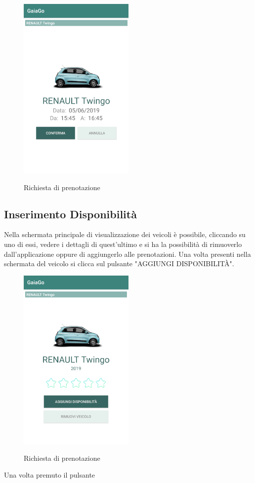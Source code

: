 \begin{itemize}
\begin{figure}[H]
		\includegraphics[width=0.5\textwidth]{res/images/conferma_prenotazione.png}\\
		\caption{Richiesta di prenotazione}
		\label{prenotazione}
	\end{figure}
\end{itemize}
\pagebreak

\subsection{Inserimento Disponibilità}
Nella schermata principale di visualizzazione dei veicoli è possibile, cliccando su uno di essi, vedere i dettagli di quest'ultimo e si ha la possibilità di rimuoverlo dall'applicazione oppure di aggiungerlo alle prenotazioni. Una volta presenti nella schermata del veicolo si clicca sul pulsante "AGGIUNGI DISPONIBILITÀ".
	  \begin{figure}[H] 
	\centering 
	\includegraphics[width=0.5\textwidth]{res/images/aggiungi_disponibilita1.png}\\
	\caption{Richiesta di prenotazione}
	\label{prenotazione}
\end{figure}

Una volta premuto il pulsante 

